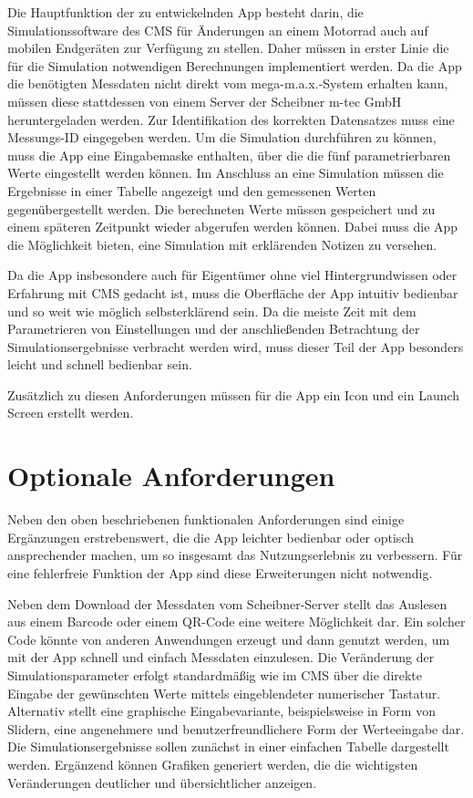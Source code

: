 	Die Hauptfunktion der zu entwickelnden App besteht darin, die Simulationssoftware des CMS für Änderungen an einem Motorrad auch auf mobilen Endgeräten zur Verfügung zu stellen. Daher müssen in erster Linie die für die Simulation notwendigen Berechnungen implementiert werden. Da die App die benötigten Messdaten nicht direkt vom mega-m.a.x.-System erhalten kann, müssen diese stattdessen von einem Server der Scheibner m-tec GmbH heruntergeladen werden. Zur Identifikation des korrekten Datensatzes muss eine Messungs-ID eingegeben werden. Um die Simulation durchführen zu können, muss die App eine Eingabemaske enthalten, über die die fünf parametrierbaren Werte eingestellt werden können. Im Anschluss an eine Simulation müssen die Ergebnisse in einer Tabelle angezeigt und den gemessenen Werten gegenübergestellt werden. Die berechneten Werte müssen gespeichert und zu einem späteren Zeitpunkt wieder abgerufen werden können. Dabei muss die App die Möglichkeit bieten, eine Simulation mit erklärenden Notizen zu versehen.
	
	Da die App insbesondere auch für Eigentümer ohne viel Hintergrundwissen oder Erfahrung mit CMS gedacht ist, muss die Oberfläche der App intuitiv bedienbar und so weit wie möglich selbsterklärend sein. Da die meiste Zeit mit dem Parametrieren von Einstellungen und der anschließenden Betrachtung der Simulationsergebnisse verbracht werden wird, muss dieser Teil der App besonders leicht und schnell bedienbar sein.
	
	Zusätzlich zu diesen Anforderungen müssen für die App ein Icon und ein Launch Screen erstellt werden.
	
	\section{Optionale Anforderungen}
	\label{sec:optionale-anf}
	
	Neben den oben beschriebenen funktionalen Anforderungen sind einige Ergänzungen erstrebenswert, die die App leichter bedienbar oder optisch ansprechender machen, um so insgesamt das Nutzungserlebnis zu verbessern. Für eine fehlerfreie Funktion der App sind diese Erweiterungen nicht notwendig.
	
	Neben dem Download der Messdaten vom Scheibner-Server stellt das Auslesen aus einem Barcode oder einem QR-Code eine weitere Möglichkeit dar. Ein solcher Code könnte von anderen Anwendungen erzeugt und dann genutzt werden, um mit der App schnell und einfach Messdaten einzulesen.
	Die Veränderung der Simulationsparameter erfolgt standardmäßig wie im CMS über die direkte Eingabe der gewünschten Werte mittels eingeblendeter numerischer Tastatur. Alternativ stellt eine graphische Eingabevariante, beispielsweise in Form von Slidern, eine angenehmere und benutzerfreundlichere Form der Werteeingabe dar.
	Die Simulationsergebnisse sollen zunächst in einer einfachen Tabelle dargestellt werden. Ergänzend können Grafiken generiert werden, die die wichtigsten Veränderungen deutlicher und übersichtlicher anzeigen.

